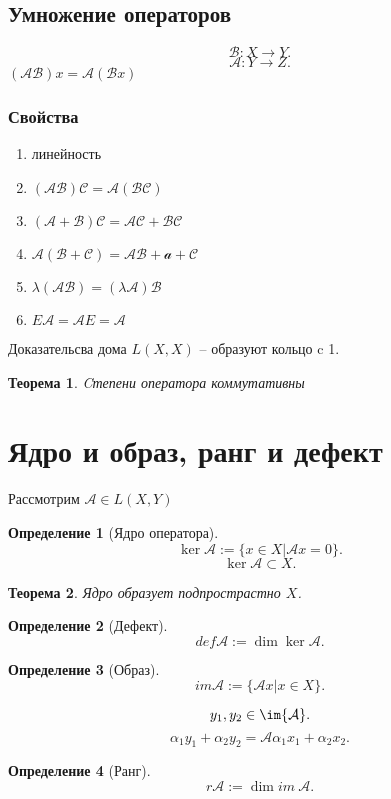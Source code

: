 \documentclass{scrartcl}
\newtheorem{theorem}{Теорема}
\newtheorem{definition}{Определение}
\begin{document}
\subsection{Умножение операторов}
\[
    \mathcal{B} : X \to Y
.\] 
\[
    \mathcal{A} : Y \to Z
.\] 
$( \mathcal{A} \mathcal{B} )x = \mathcal{A} (\mathcal{B}x)$
\subsubsection{Свойства}
\begin{enumerate}
    \item линейность
    \item $(\mathcal{A} \mathcal{B}) \mathcal{C} = \mathcal{A} (\mathcal{B} \mathcal{C})$
    \item $(\mathcal{A} + \mathcal{B}) \mathcal{C} = \mathcal{A} \mathcal{C} + \mathcal{B} \mathcal{C}$
    \item  $\mathcal{A} (\mathcal{B} + \mathcal{C}) = \mathcal{A} \mathcal{B} + \mathcal{a} + \mathcal{C}$
    \item  $\lambda(\mathcal{A} \mathcal{B}) = (\lambda \mathcal{A}) \mathcal{B}$
    \item  $E \mathcal{A} =\mathcal{A} E = \mathcal{A}$
\end{enumerate}
Доказательсва дома
$L(X,X)$ -- образуют кольцо c 1.
\begin{theorem}
    Cтепени оператора коммутативны
\end{theorem}
\section{Ядро и образ, ранг и дефект}
Рассмотрим $\mathcal{A} \in L(X,Y)$
\begin{definition}[Ядро оператора]
    \[
        \ker{\mathcal{A}} := \{x \in X | \mathcal{A} x = 0\}
    .\] 
    \[
        \ker{\mathcal{A}} \subset X
    .\] 
\end{definition}
\begin{theorem}
    Ядро образует подпрострастно $X$.
\end{theorem}
\begin{definition}[Дефект]
    \[
        def \mathcal{A} := \dim{\ker{\mathcal{A}}}
    .\] 
\end{definition}
\begin{definition}[Образ]
    \[
        im{\mathcal{A}} := \{\mathcal{A} x | x \in X\}
    .\] 
\end{definition}
\[
    y_1,y_2 \in \im{\mathcal{A}}
.\] 
\[
\alpha_1 y_1 + \alpha_2 y_2 = \mathcal{ A }\alpha_1 x_1 + \alpha_2 x_2
.\] 
\begin{definition}[Ранг]
    \[
        r{\mathcal{A}} := \dim{im~ \mathcal{A}}
    .\] 
\end{definition}
\end{document}
